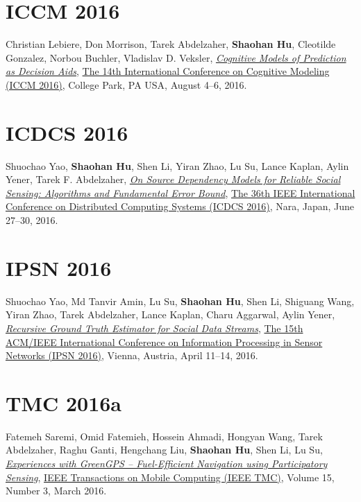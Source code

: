 \section{\sc ICCM 2016}\hypertarget{Lebiere2016iccm}{}
Christian Lebiere, Don Morrison, Tarek Abdelzaher, \textbf{Shaohan Hu}, Cleotilde Gonzalez, Norbou Buchler, Vladislav D. Veksler,
\href{http://acs.ist.psu.edu/iccm2016/proceedings/lebiere2016iccm.pdf}{\emph{Cognitive Models of Prediction as Decision Aids}},
\href{http://acs.ist.psu.edu/iccm2016/}{\textsf{The 14th International Conference on Cognitive Modeling (ICCM 2016)}},
College Park, PA USA, August 4--6, 2016.

\section{\sc ICDCS 2016}\hypertarget{yao2016icdcs}{}
Shuochao Yao, \textbf{Shaohan Hu}, Shen Li, Yiran Zhao, Lu Su, Lance Kaplan, Aylin Yener, Tarek F. Abdelzaher,
\href{http://ieeexplore.ieee.org/document/7536545}{\emph{On Source Dependency Models for Reliable Social Sensing: Algorithms and Fundamental Error Bound}},
\href{http://www-higashi.ist.osaka-u.ac.jp/icdcs2016/}{\textsf{The 36th IEEE International Conference on Distributed Computing Systems (ICDCS 2016)}},
Nara, Japan, June 27--30, 2016.

\section{\sc IPSN 2016}\hypertarget{yao2016ipsn}{}
Shuochao Yao, Md Tanvir Amin, Lu Su, \textbf{Shaohan Hu}, Shen Li, Shiguang Wang, Yiran Zhao, Tarek Abdelzaher, Lance Kaplan, Charu Aggarwal, Aylin Yener,
\href{http://ieeexplore.ieee.org/document/7460719}{\emph{Recursive Ground Truth Estimator for Social Data Streams}},
\href{http://ipsn.acm.org/2016/}{\textsf{The 15th ACM/IEEE International Conference on Information Processing in Sensor Networks (IPSN 2016)}},
Vienna, Austria, April 11--14, 2016.

\section{\sc TMC 2016a}\hypertarget{saremi2016tmc}{}
Fatemeh Saremi, Omid Fatemieh, Hossein Ahmadi, Hongyan Wang, Tarek Abdelzaher, Raghu Ganti, Hengchang Liu, \textbf{Shaohan Hu}, Shen Li, Lu Su,
\href{http://ieeexplore.ieee.org/document/7084108}{\emph{Experiences with GreenGPS -- Fuel-Efficient Navigation using Participatory Sensing}},
\href{http://www.computer.org/web/tmc}{\textsf{IEEE Transactions on Mobile Computing (IEEE TMC)}},
Volume 15, Number 3, March 2016.

